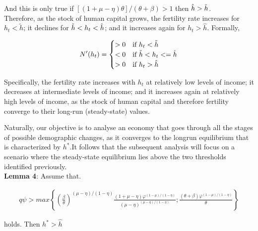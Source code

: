 \begin{enumerate}[label=(\alph*)]
\begin{enumerate}[label=(\roman*)]
And this is only true if  $[(1+\mu - \eta )\theta]/(\theta + \beta)>1$ then $\hat{h} > \Tilde{h}$. \\

Therefore, as the stock of human capital grows, the fertility rate increases for $h_t < \tilde{h}$; it declines for $\Tilde{h} < h_t < \hat{h}$; and it increases again for $h_t > \hat{h}$.
Formally,

    \begin{equation}
    \begin{aligned}
    N'(h_t) = \begin{cases}
                    > 0     & \text{if } h_t < \Tilde{h} \\
                    < 0     & \text{if } \Tilde{h} < h_t <= \hat{h} \\
                    > 0     & \text{if } h_t > \hat{h} \\
                    \end{cases}
    \end{aligned}
    \end{equation}
    
Specifically, the fertility rate increases with $h_t$ at relatively low levels of income; it decreases at intermediate levels of income; and it increases again at relatively high levels of income, as the stock of human capital and therefore fertility converge to their long-run (steady-state) values.

Naturally, our objective is to analyse an economy that goes through all the stages of possible demographic changes, as it converges to the longrun equilibrium that is characterized by $h^{*}$.It follows that the subsequent
analysis will focus on a scenario where the steady-state equilibrium lies
above the two thresholds identified previously. \\
\textbf{Lemma 4}: Assume that.

    \begin{equation}
    \begin{aligned}
    q\psi > max \left\{ \left(\frac{\beta}{\theta}\right)^{(\mu - \eta)/(1-\eta)} \frac{(1+\mu -\eta)\varphi^{(1-\mu)/(1-\eta)}}{(\mu - \eta)^{(\mu - \eta)/(1-\eta)}};\frac{(\theta + \beta) \varphi^{(1-\mu)/(1-\eta)}}{\theta} \right\}
    \end{aligned}
    \end{equation}
    
holds. Then $h^{*} > \hat{h}$ \\


\end{enumerate}
\end{enumerate}
